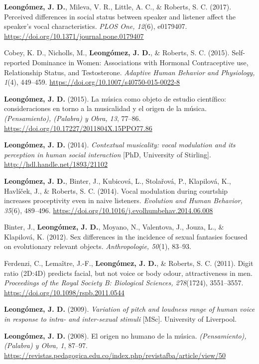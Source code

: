 \documentclass[11pt,a4paper,]{awesome-cv}
\begin{document}
\textbf{Leongómez, J. D.}, Mileva, V. R., Little, A. C., \& Roberts, S.
C. (2017). Perceived differences in social status between speaker and
listener affect the speaker's vocal characteristics. \emph{PLOS One,
12}(6), e0179407. \url{https://doi.org/10.1371/journal.pone.0179407}

Cobey, K. D., Nicholls, M., \textbf{Leongómez, J. D.}, \& Roberts, S. C.
(2015). Self-reported Dominance in Women: Associations with Hormonal
Contraceptive use, Relationship Status, and Testosterone. \emph{Adaptive
Human Behavior and Physiology, 1}(4), 449--459.
\url{https://doi.org/10.1007/s40750-015-0022-8}

\textbf{Leongómez, J. D.} (2015). La música como objeto de estudio
científico: consideraciones en torno a la musicalidad y el origen de la
música. \emph{(Pensamiento), (Palabra) y Obra, 13}, 77--86.
\url{https://doi.org/10.17227/2011804X.15PPO77.86}

\textbf{Leongómez, J. D.} (2014). \emph{Contextual musicality: vocal
modulation and its perception in human social interaction} {[}PhD,
University of Stirling{]}. \url{http://hdl.handle.net/1893/21102}

\textbf{Leongómez, J. D.}, Binter, J., Kubicová, L., Stolařová, P.,
Klapilová, K., Havlíček, J., \& Roberts, S. C. (2014). Vocal modulation
during courtship increases proceptivity even in naive listeners.
\emph{Evolution and Human Behavior, 35}(6), 489--496.
\url{https://doi.org/10.1016/j.evolhumbehav.2014.06.008}

Binter, J., \textbf{Leongómez, J. D.}, Moyano, N., Valentova, J., Jouza,
L., \& Klapilová, K. (2012). Sex differences in the incidence of sexual
fantasies focused on evolutionary relevant objects. \emph{Anthropologie,
50}(1), 83--93.

Ferdenzi, C., Lemaître, J.-F., \textbf{Leongómez, J. D.}, \& Roberts, S.
C. (2011). Digit ratio (2D:4D) predicts facial, but not voice or body
odour, attractiveness in men. \emph{Proceedings of the Royal Society B:
Biological Sciences, 278}(1724), 3551--3557.
\url{https://doi.org/10.1098/rspb.2011.0544}

\textbf{Leongómez, J. D.} (2009). \emph{Variation of pitch and loudness
range of human voice in response to intra- and inter-sexual stimuli}
{[}MSc{]}. University of Liverpool.

\textbf{Leongómez, J. D.} (2008). El origen no humano de la música.
\emph{(Pensamiento), (Palabra) y Obra, 1}, 87--97.
\url{https://revistas.pedagogica.edu.co/index.php/revistafba/article/view/50}
\end{document}
